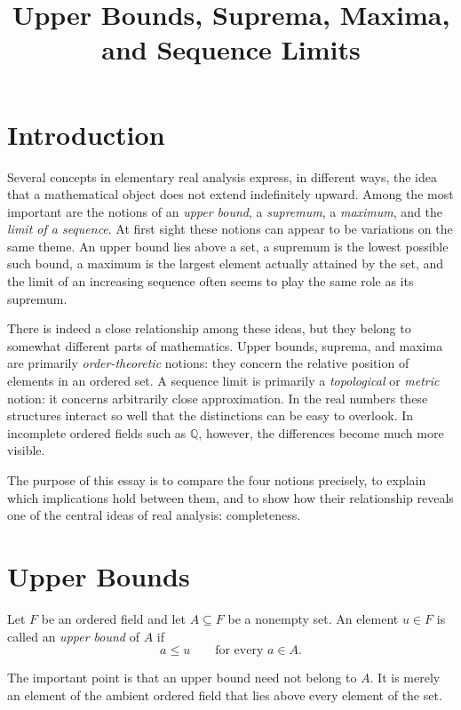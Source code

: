 \documentclass{essay}
\title{Upper Bounds, Suprema, Maxima, and Sequence Limits}
\author{}
\date{}
\begin{document}
\maketitle

\section{Introduction}

Several concepts in elementary real analysis express, in different ways, the idea that a mathematical object does not extend indefinitely upward. Among the most important are the notions of an \emph{upper bound}, a \emph{supremum}, a \emph{maximum}, and the \emph{limit of a sequence}. At first sight these notions can appear to be variations on the same theme. An upper bound lies above a set, a supremum is the lowest possible such bound, a maximum is the largest element actually attained by the set, and the limit of an increasing sequence often seems to play the same role as its supremum.

There is indeed a close relationship among these ideas, but they belong to somewhat different parts of mathematics. Upper bounds, suprema, and maxima are primarily \emph{order-theoretic} notions: they concern the relative position of elements in an ordered set. A sequence limit is primarily a \emph{topological} or \emph{metric} notion: it concerns arbitrarily close approximation. In the real numbers these structures interact so well that the distinctions can be easy to overlook. In incomplete ordered fields such as \(\mathbb{Q}\), however, the differences become much more visible.

The purpose of this essay is to compare the four notions precisely, to explain which implications hold between them, and to show how their relationship reveals one of the central ideas of real analysis: completeness.

\section{Upper Bounds}

Let \(F\) be an ordered field and let \(A\subseteq F\) be a nonempty set. An element \(u\in F\) is called an \emph{upper bound} of \(A\) if
\[ a\leq u \qquad\text{for every }a\in A. \]

The important point is that an upper bound need not belong to \(A\). It is merely an element of the ambient ordered field that lies above every element of the set.
\end{document}
